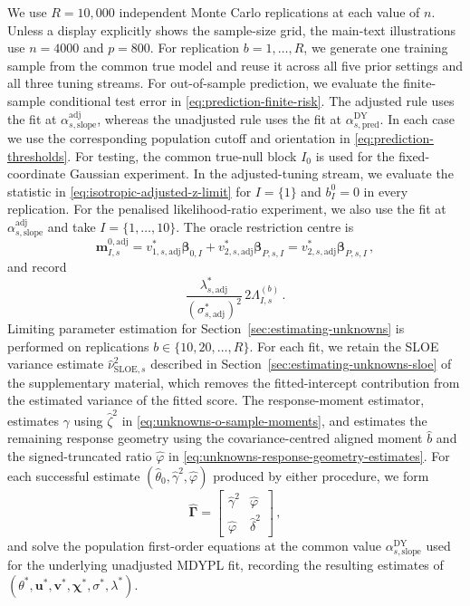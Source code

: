 \documentclass{article}
\theoremstyle{definition}
\newcommand*{\bb}{\boldsymbol}
\def\bu{\bb{u}}
\def\bv{\bb{v}}
\def\bbeta{\bb{\beta}}
\begin{document}
\begin{bibunit}
We use $R=10{,}000$ independent Monte Carlo replications at each value of $n$.
Unless a display explicitly shows the sample-size grid, the main-text
illustrations use $n=4000$ and $p=800$.
For replication $b=1,\ldots,R$, we generate one training sample from the common
true model and reuse it across all five prior settings and all three tuning streams.
For out-of-sample prediction, we evaluate the finite-sample conditional test
error in \eqref{eq:prediction-finite-risk}. The adjusted rule uses the fit at
$\alpha_{s,\mathrm{slope}}^{\mathrm{adj}}$, whereas the unadjusted rule uses the
fit at $\alpha_{s,\mathrm{pred}}^{\mathrm{DY}}$. In each case we use the
corresponding population cutoff and orientation in
\eqref{eq:prediction-thresholds}. 
For testing, the common true-null block $I_0$ is used for the fixed-coordinate Gaussian
experiment. In the adjusted-tuning stream, we evaluate the statistic in
\eqref{eq:isotropic-adjusted-z-limit} for $I=\{1\}$ and $b_I^0=0$ in every
replication. 
For the penalised likelihood-ratio experiment, we also use the fit at
$\alpha_{s,\mathrm{slope}}^{\mathrm{adj}}$ and take
$I=\{1,\ldots,10\}$. The oracle restriction centre is
$$
    \bb m_{I,s}^{0,\mathrm{adj}}
    =
    v_{1,s,\mathrm{adj}}^*\bbeta_{0,I}
    +
    v_{2,s,\mathrm{adj}}^*\bbeta_{P,s,I}
    =
    v_{2,s,\mathrm{adj}}^*\bbeta_{P,s,I}\,, 
$$
and record
$$
    \frac{
        \lambda_{s,\mathrm{adj}}^*
    }{
        (\sigma_{s,\mathrm{adj}}^*)^2
    }
    \,2\Lambda_{I,s}^{(b)} \,. 
$$
Limiting parameter estimation for Section~\ref{sec:estimating-unknowns} is performed on 
replications
$b\in\{10,20,\ldots,R\}$. For each fit, we retain the
SLOE variance estimate $\widehat\nu_{\mathrm{SLOE},s}^2$ described in
Section~\ref{sec:estimating-unknowns-sloe} of the supplementary material,
which removes the fitted-intercept contribution from the estimated variance
of the fitted score. The
response-moment estimator, estimates
$\gamma$ using $\widehat{\zeta}^2$ in
\eqref{eq:unknowns-o-sample-moments}, and estimates the remaining response
geometry using the covariance-centred aligned moment $\widehat b$ and the
signed-truncated ratio $\widehat\varphi$ in
\eqref{eq:unknowns-response-geometry-estimates}. 
For each successful estimate
$(\widehat\theta_0,\widehat\gamma^2,\widehat\varphi)$ produced by either
procedure, we form
$$
    \widehat{\bb\Gamma}
    =
    \begin{bmatrix}
        \widehat\gamma^2 & \widehat\varphi\\
        \widehat\varphi & \widehat\delta^2
    \end{bmatrix}\,,
$$
and solve the population first-order equations at the common value
$\alpha_{s,\mathrm{slope}}^{\mathrm{DY}}$ used for the underlying
unadjusted MDYPL fit, recording the resulting estimates of
$(\theta^*,\bu^*,\bv^*,\bb\chi^*,\sigma^*,\lambda^*)$. 





\end{bibunit}
\end{document}
